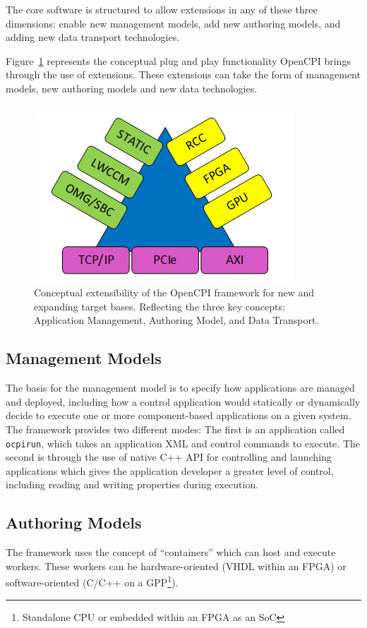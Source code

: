 The core software is structured to allow extensions in any of these three dimensions: enable new management models, add new authoring models, and adding new data transport technologies. \newline

Figure~\ref{fig:what_is_opencpi} represents the conceptual plug and play functionality OpenCPI brings through the use of extensions.
These extensions can take the form of management models, new authoring models and new data technologies.

\begin{figure}[h]
\centerline{\includegraphics[scale=0.75]{./figures/pillars_of_ocpi.png}}
\caption{Conceptual extensibility of the OpenCPI framework for new and expanding target bases. Reflecting the three key concepts: Application Management, Authoring Model, and Data Transport.}
\label{fig:what_is_opencpi}
\end{figure}

\subsection{Management Models}
\label{subsec:Mangement_models}
The basis for the management model is to specify how applications are managed and deployed, including how a control application would statically or dynamically decide to execute one or more component-based applications on a given system.
The framework provides two different modes:
The first is an application called \verb+ocpirun+, which takes an application XML and control commands to execute.
The second is through the use of native C++ API for controlling and launching applications which gives the application developer a greater level of control, including reading and writing properties during execution.

\subsection{Authoring Models}
\label{subsec:Authoring_Models}
The framework uses the concept of ``containers'' which can host and execute workers. These workers can be hardware-oriented (VHDL within an FPGA) or software-oriented (C/C++ on a GPP\footnote{Standalone CPU or embedded within an FPGA as an SoC}).

